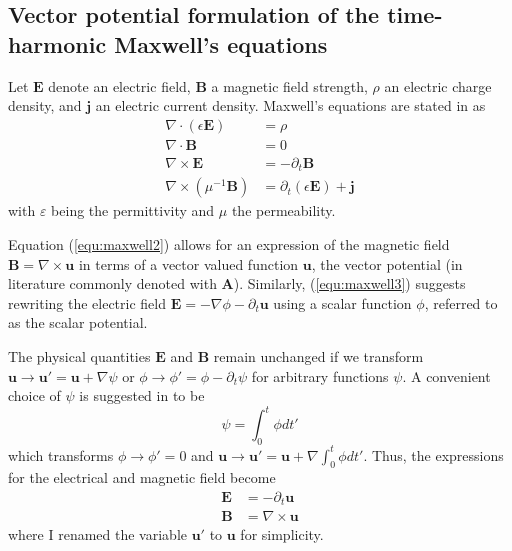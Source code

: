 \documentclass[11pt, a4paper]{article}
\begin{document}
\subsection{Vector potential formulation of the time-harmonic Maxwell's equations}
\label{subsec:maxwell-potential}
\the\textwidth


Let $\mathbf{E}$ denote an electric field, $\mathbf{B}$ a magnetic field
strength, $\rho$ an electric charge density, and $\mathbf{j}$ an electric
current density. Maxwell's equations are stated in \citep{monk} as
\begin{align}
    \nabla \cdot (\epsilon \mathbf{E}) &= \rho \label{equ:maxwell1} \\
    \nabla \cdot \mathbf{B} &= 0 \label{equ:maxwell2} \\
    \nabla \times \mathbf{E} &= -\partial_t \mathbf{B} \label{equ:maxwell3} \\
    \nabla \times (\mu^{-1} \mathbf{B}) &= \partial_t (\epsilon \mathbf{E}) + \mathbf{j} \label{equ:maxwell4}
\end{align}
with $\varepsilon$ being the permittivity and $\mu$ the permeability.


Equation (\ref{equ:maxwell2}) allows for an expression of the magnetic field 
$\mathbf{B} = \nabla \times \mathbf{u}$ in terms of a vector valued function
$\mathbf{u}$, the vector potential (in literature commonly denoted with
$\mathbf{A}$). Similarly, (\ref{equ:maxwell3}) suggests
rewriting the electric field $\mathbf{E} = - \nabla \phi - \partial_t \mathbf{u}$
using a scalar function $\phi$, referred to as the scalar potential.

The physical quantities $\mathbf{E}$ and $\mathbf{B}$ remain unchanged 
if we transform $\mathbf{u} \to \mathbf{u}' = \mathbf{u} + \nabla \psi$ or
$\phi \to \phi' = \phi - \partial_t \psi$ for arbitrary functions $\psi$.
A convenient choice of $\psi$ is suggested in \citep{gauge-transformation} to be
\begin{equation}
    \psi = \int_0^t \phi dt' \label{equ:gauge}
\end{equation}
which transforms $\phi \to \phi' = 0$ and $\mathbf{u} \to \mathbf{u}' = \mathbf{u}
+ \nabla \int_0^t \phi dt'$. Thus, the expressions for the electrical and
magnetic field become
\begin{align}
    \mathbf{E} &= -\partial_t \mathbf{u} \label{equ:electricfield} \\
    \mathbf{B} &= \nabla \times \mathbf{u} \label{equ:magneticfield}
\end{align}
where I renamed the variable $\mathbf{u}'$ to $\mathbf{u}$ for simplicity.
\end{document}
